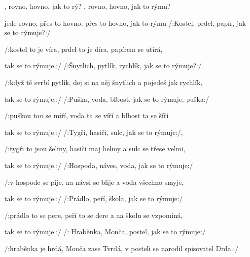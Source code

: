 

\zs
{}, rovno, hovno, jak  to rý?
, rovno, hovno, jak  to rýmu?

 jede rovno,  přes to hovno,
 přes to hovno, jak  to rýmu
\ks
\zs
/:Kostel, prdel, papír, jak se to rýmuje?:/

/:kostel to je víra, prdel to je díra, papírem se utírá,

tak se to rýmuje.:/
\ks
\zs
/:Šnytlich, pytlík, rychlík, jak se to rýmuje?:/

/:když tě svrbí pytlík, dej si na něj šnytlich a pojedeš jak rychlík,

tak se to rýmuje.:/
\ks
\zs
/:Puška, voda, blbost, jak se to rýmuje, puška:/

/:puškou tou se míří, voda ta se víří a blbost ta se šíří

tak se to rýmuje.:/
\ks
\zs
/:Tygři, hasiči, sulc, jak se to rýmuje:/,

/:tygři to jsou šelmy, hasiči maj helmy a sulc se třese velmi,

tak se to rýmuje.:/
\ks
\zs
/:Hospoda, náves, voda, jak se to rýmuje:/

/:v hospode se pije, na návsi se blije a voda všechno smyje,

tak se to rýmuje.:/
\ks
\zs
/:Prádlo, peří, škola, jak se to rýmuje:/

/:prádlo to se pere, peří to se dere a na školu se vzpomíná,

tak se to rýmuje.:/
\ks
\zs
/: Hraběnka, Monča, postel, jak se to rýmuje:/

/:hraběnka je hrdá, Monča zase Tvrdá, v posteli se narodil spisovatel Drda.:/
\ks


\kp























